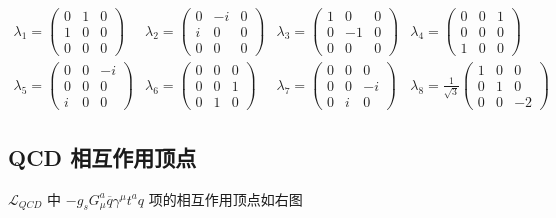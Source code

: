 \begin{align}
    \lambda_1=\begin{pmatrix}
    0 & 1 & 0 \\
    1 & 0 & 0 \\
    0 & 0 & 0
    \end{pmatrix} & \lambda_2=\begin{pmatrix}
    0 & -i & 0 \\
    i & 0 & 0 \\
    0 & 0 & 0
    \end{pmatrix} & \lambda_3=\begin{pmatrix}
    1 & 0 & 0 \\
    0 & -1 & 0 \\
    0 & 0 & 0
    \end{pmatrix} & \lambda_4=\begin{pmatrix}
    0 & 0 & 1 \\
    0 & 0 & 0 \\
    1 & 0 & 0
    \end{pmatrix} \\
    \lambda_5=\begin{pmatrix}
    0 & 0 & -i \\
    0 & 0 & 0 \\
    i & 0 & 0
    \end{pmatrix} & \lambda_6=\begin{pmatrix}
    0 & 0 & 0 \\
    0 & 0 & 1 \\
    0 & 1 & 0
    \end{pmatrix} & \lambda_7=\begin{pmatrix}
    0 & 0 & 0 \\
    0 & 0 & -i \\
    0 & i & 0
    \end{pmatrix} & \lambda_8=
    \frac{1}{\sqrt{3}}\begin{pmatrix}
    1 & 0 & 0 \\
    0 & 1 & 0 \\
    0 & 0 & -2
    \end{pmatrix}
\end{align}

\subsection{QCD 相互作用顶点}

$\mathcal{L}_{QCD}$ 中 $-g_s G^a_\mu \overline{q} \gamma^\mu t^a q$ 项的相互作用顶点如右图

